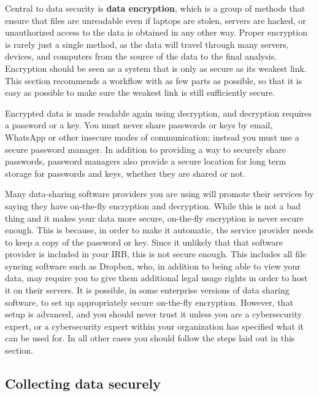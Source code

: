 Central to data security is \textbf{data encryption}, which is a group
of methods that ensure that files are unreadable even if laptops are stolen, servers
are hacked, or unauthorized access to the data is obtained in any other way.
Proper encryption is rarely just a single method,
as the data will travel through many servers, devices, and computers
from the source of the data to the final analysis.
Encryption should be seen as a system that is only as secure as its weakest link.
This section recommends a workflow with as few parts as possible,
so that it is easy as possible to make sure the weakest link is still sufficiently secure.

Encrypted data is made readable again using decryption,
and decryption requires a password or a key.
You must never share passwords or keys by email,
WhatsApp or other insecure modes of communication;
instead you must use a secure password manager.
In addition to providing a way to securely share passwords,
password managers also provide a secure location
for long term storage for passwords and keys, whether they are shared or not.

Many data-sharing software providers you are using will promote their services
by saying they have on-the-fly encryption and decryption.
While this is not a bad thing and it makes your data more secure,
on-the-fly encryption is never secure enough.
This is because, in order to make it automatic,
the service provider needs to keep a copy of the password or key.
Since it unlikely that that software provider is included in your IRB,
this is not secure enough.
This includes all file syncing software such as Dropbox,
who, in addition to being able to view your data, may require
you to give them additional legal usage rights in order to host it on their servers.
It is possible, in some enterprise versions of data sharing software,
to set up appropriately secure on-the-fly encryption.
However, that setup is advanced, and you should never trust it
unless you are a cybersecurity expert,
or a cybersecurity expert within your organization
has specified what it can be used for.
In all other cases you should follow the steps laid out in this section.

\subsection{Collecting data securely}

